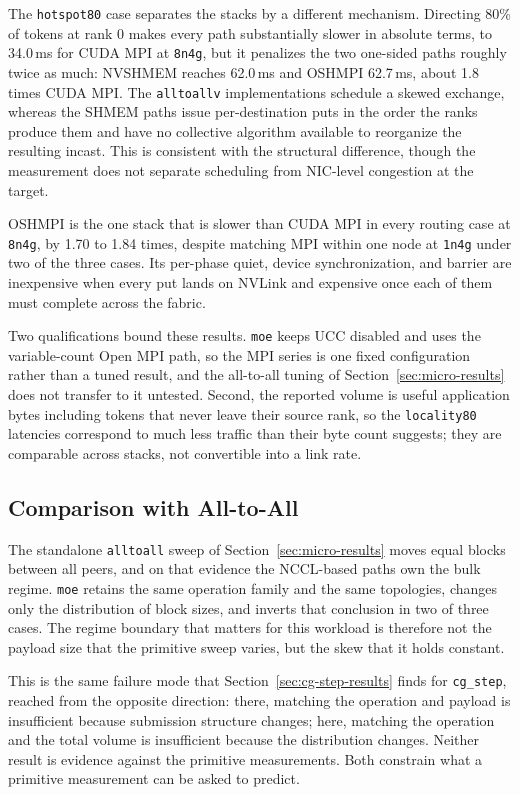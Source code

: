 The \texttt{hotspot80} case separates the stacks by a different mechanism. Directing 80\% of tokens at rank 0 makes every path substantially slower in absolute terms, to 34.0\,ms for CUDA MPI at \texttt{8n4g}, but it penalizes the two one-sided paths roughly twice as much: NVSHMEM reaches 62.0\,ms and OSHMPI 62.7\,ms, about 1.8 times CUDA MPI. The \texttt{alltoallv} implementations schedule a skewed exchange, whereas the SHMEM paths issue per-destination puts in the order the ranks produce them and have no collective algorithm available to reorganize the resulting incast. This is consistent with the structural difference, though the measurement does not separate scheduling from NIC-level congestion at the target.

OSHMPI is the one stack that is slower than CUDA MPI in every routing case at \texttt{8n4g}, by 1.70 to 1.84 times, despite matching MPI within one node at \texttt{1n4g} under two of the three cases. Its per-phase quiet, device synchronization, and barrier are inexpensive when every put lands on NVLink and expensive once each of them must complete across the fabric.

Two qualifications bound these results. \texttt{moe} keeps UCC disabled and uses the variable-count Open MPI path, so the MPI series is one fixed configuration rather than a tuned result, and the all-to-all tuning of Section~\ref{sec:micro-results} does not transfer to it untested. Second, the reported volume is useful application bytes including tokens that never leave their source rank, so the \texttt{locality80} latencies correspond to much less traffic than their byte count suggests; they are comparable across stacks, not convertible into a link rate.

\subsection{Comparison with All-to-All}

The standalone \texttt{alltoall} sweep of Section~\ref{sec:micro-results} moves equal blocks between all peers, and on that evidence the NCCL-based paths own the bulk regime. \texttt{moe} retains the same operation family and the same topologies, changes only the distribution of block sizes, and inverts that conclusion in two of three cases. The regime boundary that matters for this workload is therefore not the payload size that the primitive sweep varies, but the skew that it holds constant.

This is the same failure mode that Section~\ref{sec:cg-step-results} finds for \texttt{cg\_step}, reached from the opposite direction: there, matching the operation and payload is insufficient because submission structure changes; here, matching the operation and the total volume is insufficient because the distribution changes. Neither result is evidence against the primitive measurements. Both constrain what a primitive measurement can be asked to predict.

